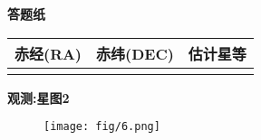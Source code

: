 \documentclass[a4paper,fontset=fandol]{ctexart}
\begin{document}
	\vspace{3em}
	\textbf{\Large 答题纸}
	
	\begin{tabular}{|c|c|c|}
		\hline
		赤经(RA) & 赤纬(DEC) & 估计星等 \\
		\hline
		&&\\
		\hline
	\end{tabular}
	
	\newpage
	{
		\Large\bfseries\noindent 观测:\hspace{0.5em}星图2
	}
	
	\begin{figure}[!h]
		\centering
		\texttt{[image: fig/6.png]}
	\end{figure}
	
\end{document}
